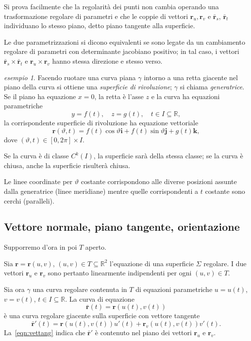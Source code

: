 \documentclass[a4paper]{book}
\numberwithin{equation}{section}
\renewcommand{\theta}{\vartheta}
\theoremstyle{plain}
\theoremstyle{definition}
\theoremstyle{remark}
\renewcommand{\vec}{\boldsymbol}
\theoremstyle{example}
\newtheorem{exmp}{esempio}[section]
\begin{document}
Si prova facilmente che la regolarità dei punti non cambia operando una trasformazione regolare di parametri e che le coppie di vettori $\vec{r}_u, \vec{r}_v$ e $\bar{\vec{r}}_s$, $\bar{\vec{r}}_t$ individuano lo stesso piano, detto piano tangente alla superficie.

Le due parametrizzazioni si dicono equivalenti se sono legate da un cambiamento regolare di parametri con determinante jacobiano positivo; in tal caso, i vettori $\bar{\vec{r}}_s \times \bar{\vec{r}}_t$ e $\vec{r}_u \times \vec{r}_v$ hanno stessa direzione e stesso verso.

\begin{exmp}
	Facendo ruotare una curva piana $\gamma$ intorno a una retta giacente nel piano della curva si ottiene una \emph{superficie di rivoluzione}; $\gamma$ si chiama \emph{generatrice}. Se il piano ha equazione $x= 0$, la retta è l'asse $z$ e la curva ha equazioni parametriche
	\begin{equation*}
		y = f(t), \quad z = g(t), \quad t \in I \subseteq \mathbb{R},
	\end{equation*}
	la corrispondente superficie di rivoluzione ha equazione vettoriale
	\begin{equation}
		\vec{r}(\theta, t) = f(t)\cos\theta \vec{i}+f(t)\sin\theta\vec{j} + g(t) \vec{k},
	\end{equation}
	dove $(\theta, t) \in [0, 2\pi] \times I$.
	\end{exmp} Se la curva è di classe $C^k(I)$, la superficie sarà della stessa classe; se la curva è chiusa, anche la superficie risulterà chiusa.

	Le linee coordinate per $\theta$ costante corrispondono alle diverse posizioni assunte dalla generatrice (linee meridiane) mentre quelle corrispondenti a $t$ costante sono cerchi (paralleli).

	\subsection{Vettore normale, piano tangente, orientazione}

	Supporremo d'ora in poi $T$ aperto.

	Sia $\vec{r} = \vec{r}(u ,v)$, $(u, v) \in T \subseteq \mathbb{R}^2$ l'equazione di una superficie $\Sigma$ regolare. I due vettori $\vec{r}_u$ e $\vec{r}_v$ sono pertanto linearmente indipendenti per ogni $(u, v) \in T$.

	Sia ora $\gamma$ una curva regolare contenuta in $T$ di equazioni parametriche $u = u(t)$, $v = v(t)$, $t \in I \subseteq \mathbb{R}$. La curva di equazione
	\begin{equation}
		\label{eqn:curva}
		\bar{\vec{r}}(t) = \vec{r}(u(t), v(t))
	\end{equation}
	è una curva regolare giacente sulla superficie con vettore tangente
	\begin{equation}
		\label{eqn:vettang}
		\bar{\vec{r}}'(t) = \vec{r}(u(t), v(t))u'(t) + \vec{r}_v(u(t), v(t))v'(t).
	\end{equation}
	La~\eqref{eqn:vettang} indica che $\bar{\vec{r}}'$ è contenuto nel piano dei vettori $\vec{r}_u$ e $\vec{r}_v$.
\end{document}

